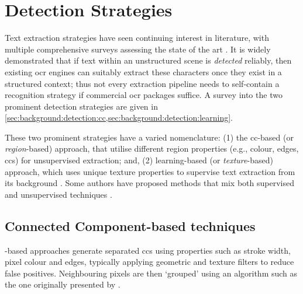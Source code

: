 \section{Detection Strategies}
\label{sec:background:detection_strategies}

Text extraction strategies have seen continuing interest in literature, with multiple comprehensive surveys assessing the state of the art \cite{Chen:2000ua, Jung:2004uwa, Zhang:2008vfa, Liang:2005uy, Jung:2004uw}. It is widely demonstrated that if text within an unstructured scene is \textit{detected} reliably, then existing \gls{ocr} engines can suitably extract these characters \citep{Smith:2007dc} once they exist in a structured context; thus not every extraction pipeline needs to self-contain a recognition strategy if commercial \gls{ocr} packages suffice. A survey into the two prominent detection strategies are given in \cref{sec:background:detection:cc,sec:background:detection:learning}.

These two prominent strategies have a varied nomenclature: (1) the \gls{cc}-based (or \textit{region}-based) approach, that utilise different region properties (e.g., colour, edges, \glspl{cc}) \citep{Jain:1998wd, Kim:1996tw, Liu:2006wh, Chen:2011ul, Li:2012wd, Zhang:2011cl, Shivakumara:2011dn, Epshtein:2010tj, Zhang:2010wa, Shivakumara:2010wu, Liu:2008tz, Subramanian:2007tf, Lee:2010vv, Sun:2010tg} for unsupervised extraction; and, (2) learning-based (or \textit{texture}-based) approach, which uses unique texture properties to supervise text extraction from its background \citep{Ye:2005wu,XiangrongChen:2004ha,Pan:2010cj,Gllavata:2004vq,Minetto:2010tg,Phan:2009bc,Lee:2003cn,Lienhart:2002ub,Li:2000uf,Wang:2009il,Dalal:2005jq,Hanif:2009tm,Tu:2003tg,Chen:2005wv}. Some authors have proposed methods that mix both supervised and unsupervised techniques \citep{Mutch:2006ub, Mairal:2008uw, Bengio:2006vb}.

\subsection{Connected Component-based techniques}
\label{sec:background:detection:cc}

-based approaches generate separated \glspl{cc} using properties such as stroke width, pixel colour and edges, typically applying geometric and texture filters to reduce false positives. Neighbouring pixels are then `grouped' using an algorithm such as the one originally presented by \citet{Horn:1986vc}. 

